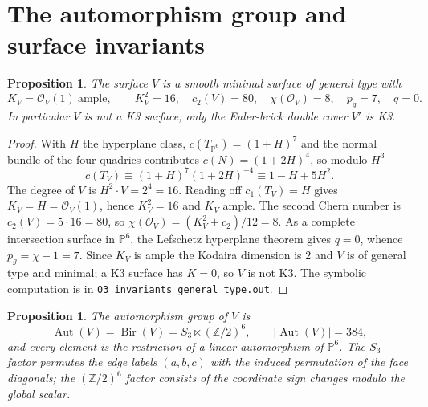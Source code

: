 \documentclass[11pt,reqno]{amsart}
\theoremstyle{plain}
\newtheorem{proposition}[theorem]{Proposition}
\theoremstyle{definition}
\theoremstyle{remark}
\newcommand{\Z}{\mathbb{Z}}
\newcommand{\PP}{\mathbb{P}}
\newcommand{\Aut}{\operatorname{Aut}}
\newcommand{\Bir}{\operatorname{Bir}}
\begin{document}
\section{The automorphism group and surface invariants}\label{sec:geometry}

\begin{proposition}\label{prop:invariants}
The surface $V$ is a smooth minimal surface of general type with
\[
K_V=\mathcal{O}_V(1)\ \text{ample},\qquad K_V^2=16,\quad c_2(V)=80,\quad
\chi(\mathcal{O}_V)=8,\quad p_g=7,\quad q=0 .
\]
In particular $V$ is \emph{not} a K3 surface; only the Euler-brick double cover
$V'$ is K3.
\end{proposition}

\begin{proof}
With $H$ the hyperplane class, $c(T_{\PP^6})=(1+H)^7$ and the normal bundle of the
four quadrics contributes $c(N)=(1+2H)^4$, so modulo $H^3$
\[
c(T_V)\equiv(1+H)^7(1+2H)^{-4}\equiv 1-H+5H^2 .
\]
The degree of $V$ is $H^2\cdot V=2^4=16$. Reading off $c_1(T_V)=H$ gives
$K_V=H=\mathcal{O}_V(1)$, hence $K_V^2=16$ and $K_V$ ample. The second Chern number
is $c_2(V)=5\cdot 16=80$, so $\chi(\mathcal{O}_V)=(K_V^2+c_2)/12=8$. As a complete
intersection surface in $\PP^6$, the Lefschetz hyperplane theorem gives $q=0$, whence
$p_g=\chi-1=7$. Since $K_V$ is ample the Kodaira dimension is $2$ and $V$ is of
general type and minimal; a K3 surface has $K=0$, so $V$ is not K3. The symbolic
computation is in \texttt{03\_invariants\_general\_type.out}.
\end{proof}

\begin{proposition}\label{prop:aut}
The automorphism group of $V$ is
\[
\Aut(V)=\Bir(V)=S_3\ltimes(\Z/2)^6,\qquad |\Aut(V)|=384,
\]
and every element is the restriction of a linear automorphism of $\PP^6$. The $S_3$
factor permutes the edge labels $(a,b,c)$ with the induced permutation of the face
diagonals; the $(\Z/2)^6$ factor consists of the coordinate sign changes modulo the
global scalar.
\end{proposition}
\end{document}

